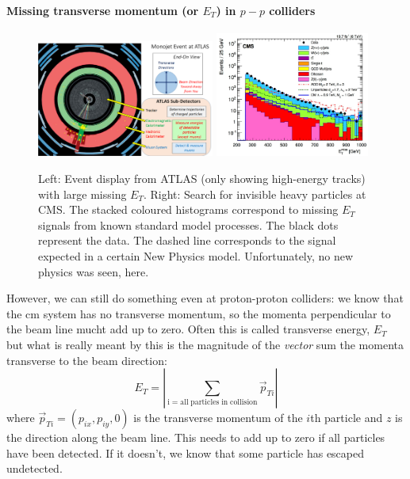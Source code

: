 \paragraph{Missing transverse momentum (or $E_T$) in $p-p$ colliders}
\label{sec:missingEt}
\begin{figure}
\includegraphics[width=0.52\textwidth]{fig/ATLAS_pp2nunuj_atlas}
\includegraphics[width=0.45\textwidth]{fig/CMS_missingEtSpectrum}
\caption{Left: Event display from ATLAS (only showing high-energy tracks) with large missing $E_T$.
Right: Search for invisible heavy particles at CMS. The stacked coloured histograms correspond to missing $E_T$ signals from known standard model processes. The black dots represent the data. The dashed line corresponds to the signal expected in a certain New Physics model. Unfortunately, no new physics was seen, here.
\label{fig:missingET_atLHC}
}
\end{figure}

However, we can still do something even at proton-proton colliders: we know that the cm system has no transverse momentum, so the momenta perpendicular to the beam line mucht add up to zero. Often this is called transverse energy, $E_T$ but what is really meant by this is the magnitude of the \emph{vector} sum the momenta transverse to the beam direction:
\begin{equation}
E_T = \left|
\sum\limits_{\mathrm{i=all\;particles\;in\;collision}} \vec{p}_{Ti} \right|
\end{equation}
where $\vec{p}_{Ti} = (p_{ix}, p_{iy}, 0)$ is the transverse momentum of the $i$th particle and $z$ is the direction along the beam line. This needs to add up to zero if all particles have been detected. If it doesn't, we know that some particle has escaped undetected.

